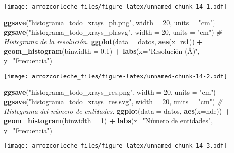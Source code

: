 \documentclass[
]{book}
\newenvironment{Shaded}{\begin{snugshade}}{\end{snugshade}}
\newcommand{\CommentTok}[1]{\textcolor[rgb]{0.56,0.35,0.01}{\textit{#1}}}
\newcommand{\DataTypeTok}[1]{\textcolor[rgb]{0.13,0.29,0.53}{#1}}
\newcommand{\DecValTok}[1]{\textcolor[rgb]{0.00,0.00,0.81}{#1}}
\newcommand{\FloatTok}[1]{\textcolor[rgb]{0.00,0.00,0.81}{#1}}
\newcommand{\KeywordTok}[1]{\textcolor[rgb]{0.13,0.29,0.53}{\textbf{#1}}}
\newcommand{\NormalTok}[1]{#1}
\newcommand{\OperatorTok}[1]{\textcolor[rgb]{0.81,0.36,0.00}{\textbf{#1}}}
\newcommand{\StringTok}[1]{\textcolor[rgb]{0.31,0.60,0.02}{#1}}
\begin{document}
\texttt{[image: arrozconleche\_files/figure-latex/unnamed-chunk-14-1.pdf]}

\begin{Shaded}
\begin{Highlighting}[]
\KeywordTok{ggsave}\NormalTok{(}\StringTok{"histograma\_todo\_xrays\_ph.png"}\NormalTok{, }\DataTypeTok{width =} \DecValTok{20}\NormalTok{, }\DataTypeTok{units =} \StringTok{"cm"}\NormalTok{)}
\KeywordTok{ggsave}\NormalTok{(}\StringTok{"histograma\_todo\_xrays\_ph.svg"}\NormalTok{, }\DataTypeTok{width =} \DecValTok{20}\NormalTok{, }\DataTypeTok{units =} \StringTok{"cm"}\NormalTok{)}
\CommentTok{\# Histograma de la resolución.}
\KeywordTok{ggplot}\NormalTok{(}\DataTypeTok{data =}\NormalTok{ datos, }\KeywordTok{aes}\NormalTok{(}\DataTypeTok{x=}\NormalTok{rs1)) }\OperatorTok{+}\StringTok{ }\KeywordTok{geom\_histogram}\NormalTok{(}\DataTypeTok{binwidth =} \FloatTok{0.1}\NormalTok{) }\OperatorTok{+}\StringTok{ }\KeywordTok{labs}\NormalTok{(}\DataTypeTok{x=}\StringTok{"Resolución (Å)"}\NormalTok{, }\DataTypeTok{y=}\StringTok{"Frecuencia"}\NormalTok{)}
\end{Highlighting}
\end{Shaded}

\texttt{[image: arrozconleche\_files/figure-latex/unnamed-chunk-14-2.pdf]}

\begin{Shaded}
\begin{Highlighting}[]
\KeywordTok{ggsave}\NormalTok{(}\StringTok{"histograma\_todo\_xrays\_res.png"}\NormalTok{, }\DataTypeTok{width =} \DecValTok{20}\NormalTok{, }\DataTypeTok{units =} \StringTok{"cm"}\NormalTok{)}
\KeywordTok{ggsave}\NormalTok{(}\StringTok{"histograma\_todo\_xrays\_res.svg"}\NormalTok{, }\DataTypeTok{width =} \DecValTok{20}\NormalTok{, }\DataTypeTok{units =} \StringTok{"cm"}\NormalTok{)}
\CommentTok{\# Histograma del número de entidades.}
\KeywordTok{ggplot}\NormalTok{(}\DataTypeTok{data =}\NormalTok{ datos, }\KeywordTok{aes}\NormalTok{(}\DataTypeTok{x=}\NormalTok{nde)) }\OperatorTok{+}\StringTok{ }\KeywordTok{geom\_histogram}\NormalTok{(}\DataTypeTok{binwidth =} \DecValTok{1}\NormalTok{) }\OperatorTok{+}\StringTok{ }\KeywordTok{labs}\NormalTok{(}\DataTypeTok{x=}\StringTok{"Número de entidades"}\NormalTok{, }\DataTypeTok{y=}\StringTok{"Frecuencia"}\NormalTok{)}
\end{Highlighting}
\end{Shaded}

\texttt{[image: arrozconleche\_files/figure-latex/unnamed-chunk-14-3.pdf]}
\end{document}
